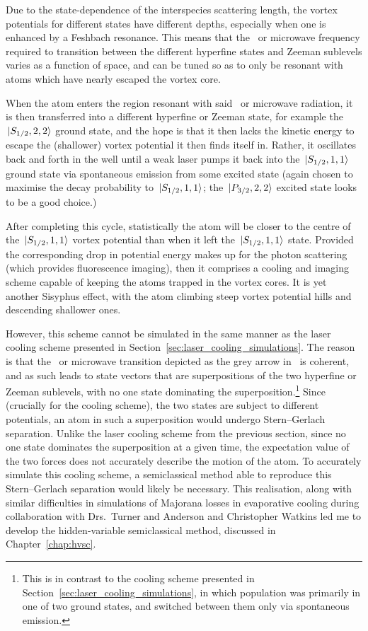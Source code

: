 Due to the state-dependence of the interspecies scattering length, the vortex potentials for different states have different depths, especially when one is enhanced by a Feshbach resonance. This means that the \rf\ or microwave frequency required to transition between the different hyperfine states and Zeeman sublevels varies as a function of space, and can be tuned so as to only be resonant with atoms which have nearly escaped the vortex core.

When the atom enters the region resonant with said \rf\ or microwave radiation, it is then transferred into a different hyperfine or Zeeman state, for example the $\ket{S_{1/2}, 2,2}$ ground state, and the hope is that it then lacks the kinetic energy to escape the (shallower) vortex potential it then finds itself in. Rather, it oscillates back and forth in the well until a weak laser pumps it back into the $\ket{S_{1/2}, 1,1}$ ground state via spontaneous emission from some excited state (again chosen to maximise the decay probability to $\ket{S_{1/2}, 1,1}$; the $\ket{P_{3/2}, 2,2}$ excited state looks to be a good choice.)

After completing this cycle, statistically the atom will be closer to the centre of the  $\ket{S_{1/2}, 1,1}$ vortex potential than when it left the $\ket{S_{1/2}, 1,1}$ state. Provided the corresponding drop in potential energy makes up for the photon scattering (which provides fluorescence imaging), then it comprises a cooling and imaging scheme capable of keeping the atoms trapped in the vortex cores. It is yet another Sisyphus effect, with the atom climbing steep vortex potential hills and descending shallower ones.

However, this scheme cannot be simulated in the same manner as the laser cooling scheme presented in Section~\ref{sec:laser_cooling_simulations}. The reason is that the \rf\ or microwave transition depicted as the grey arrow in~ is coherent, and as such leads to state vectors that are superpositions of the two hyperfine or Zeeman sublevels, with no one state dominating the superposition.\footnote{This is in contrast to the cooling scheme presented in Section~\ref{sec:laser_cooling_simulations}, in which population was primarily in one of two ground states, and switched between them only via spontaneous emission.} Since (crucially for the cooling scheme), the two states are subject to different potentials, an atom in such a superposition would undergo Stern--Gerlach separation. Unlike the laser cooling scheme from the previous section, since no one state dominates the superposition at a given time, the expectation value of the two forces does not accurately describe the motion of the atom. To accurately simulate this cooling scheme, a semiclassical method able to reproduce this Stern--Gerlach separation would likely be necessary. This realisation, along with similar difficulties in simulations of Majorana losses in evaporative cooling during collaboration with Drs.~Turner and Anderson and Christopher Watkins led me to develop the hidden-variable semiclassical method, discussed in Chapter~\ref{chap:hvsc}.

